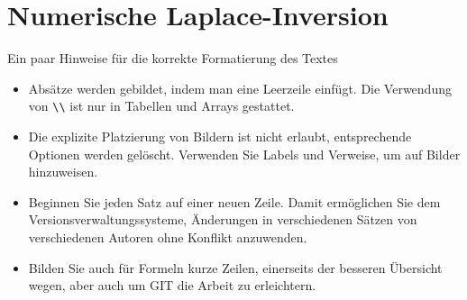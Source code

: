 %
%
%
\chapter{Numerische Laplace-Inversion\label{chapter:laplace}}
\begin{refsection}

Ein paar Hinweise für die korrekte Formatierung des Textes
\begin{itemize}
\item
Absätze werden gebildet, indem man eine Leerzeile einfügt.
Die Verwendung von \verb+\\+ ist nur in Tabellen und Arrays gestattet.
\item
Die explizite Platzierung von Bildern ist nicht erlaubt, entsprechende
Optionen werden gelöscht. 
Verwenden Sie Labels und Verweise, um auf Bilder hinzuweisen.
\item
Beginnen Sie jeden Satz auf einer neuen Zeile. 
Damit ermöglichen Sie dem Versionsverwaltungssysteme, Änderungen
in verschiedenen Sätzen von verschiedenen Autoren ohne Konflikt 
anzuwenden.
\item 
Bilden Sie auch für Formeln kurze Zeilen, einerseits der besseren
Übersicht wegen, aber auch um GIT die Arbeit zu erleichtern.
\end{itemize}






\printbibliography[heading=subbibliography]
\end{refsection}
